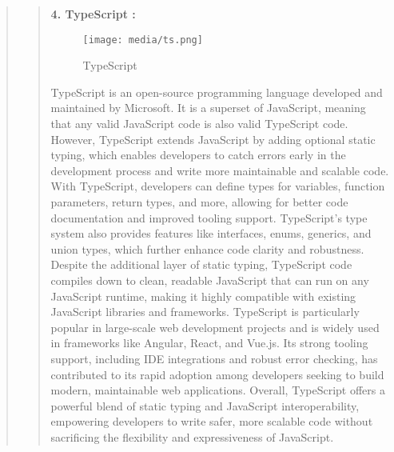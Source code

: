 \documentclass[12pt]{report}
\begin{document}
\begin{quote}
		\begin{quote}
			\textbf{4. TypeScript :}\\
			\begin{figure}
				\centering
				\texttt{[image: media/ts.png]}\\
				\caption{TypeScript}
			\end{figure}
			TypeScript is an open-source programming language developed and maintained by Microsoft. It is a superset of JavaScript, meaning that any valid JavaScript code is also valid TypeScript code. However, TypeScript extends JavaScript by adding optional static typing, which enables developers to catch errors early in the development process and write more maintainable and scalable code. With TypeScript, developers can define types for variables, function parameters, return types, and more, allowing for better code documentation and improved tooling support. TypeScript's type system also provides features like interfaces, enums, generics, and union types, which further enhance code clarity and robustness. Despite the additional layer of static typing, TypeScript code compiles down to clean, readable JavaScript that can run on any JavaScript runtime, making it highly compatible with existing JavaScript libraries and frameworks. TypeScript is particularly popular in large-scale web development projects and is widely used in frameworks like Angular, React, and Vue.js. Its strong tooling support, including IDE integrations and robust error checking, has contributed to its rapid adoption among developers seeking to build modern, maintainable web applications. Overall, TypeScript offers a powerful blend of static typing and JavaScript interoperability, empowering developers to write safer, more scalable code without sacrificing the flexibility and expressiveness of JavaScript.
		\end{quote}
		\clearpage
		

\end{quote}
\end{document}
